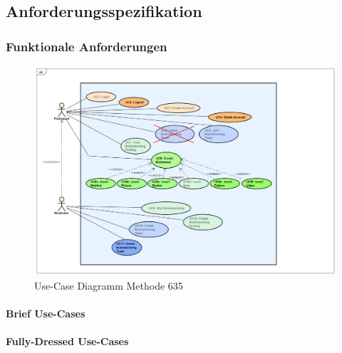 \subsection{Anforderungsspezifikation}

\subsubsection{Funktionale Anforderungen}
\begin{figure}
	\centering
	\includegraphics[width=0.7\linewidth]{./img/anforderungen/UC-Methode635.png}
	\caption{Use-Case Diagramm Methode 635}
	\label{fig:uc-methode635}
\end{figure}
\paragraph{Brief Use-Cases}


\paragraph{Fully-Dressed Use-Cases}

